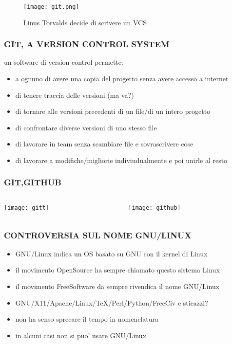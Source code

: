 \documentclass{beamer}
\begin{document}
\begin{frame}
    \begin{figure}
        \texttt{[image: git.png]}
        \caption{Linus Torvalds decide di scrivere un VCS}
    \end{figure}
\end{frame}

\begin{frame}
    \frametitle{GIT, A VERSION CONTROL SYSTEM}
        un software di version control permette:
        \begin{itemize}
            \item a ognuno di avere una copia del progetto senza avere accesso a internet
            \item di tenere traccia delle versioni (ma va?)
            \item di tornare alle versioni precedenti di un file/di un intero progetto
            \item di confrontare diverse versioni di uno stesso file
            \item di lavorare in team senza scambiare file e sovrascrivere cose
            \item di lavorare a modifiche/migliorie indiviudualmente e poi unirle al resto
        \end{itemize}
\end{frame}

\begin{frame} 
    \frametitle{GIT,GITHUB}
        \begin{columns}
            \begin{column}{0.5\textwidth}
                \begin{center}
            \texttt{[image: gitt]}
                \end{center}
        \end{column}
        \begin{column}{0.5\textwidth}  
                \begin{figure}
                    \texttt{[image: github]}
                \end{figure}
            \end{column}
        \end{columns}
    \end{frame}

\begin{frame}
    \frametitle{CONTROVERSIA SUL NOME GNU/LINUX}
    \begin{itemize}
        \item GNU/Linux indica un OS basato su GNU con il kernel di Linux
        \item il movimento OpenSource ha sempre chiamato questo sistema Linux
        \item il movimento FreeSoftware da sempre rivendica il nome GNU/Linux
        \item GNU/X11/Apache/Linux/TeX/Perl/Python/FreeCiv e sticazzi?
        \item non ha senso sprecare il tempo in nomenclatura
        \item in alcuni casi non si puo' usare GNU/Linux
    \end{itemize}
\end{frame}
\end{document}
